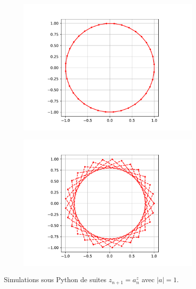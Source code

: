 \documentclass[12pt]{article}
\theoremstyle{definition}
\theoremstyle{theorem}
\begin{document}
\begin{figure}[H]
	\centering
	\begin{subfigure}{0.84\textwidth}
	\includegraphics[width=\textwidth]{resources/periodico.pdf}
	\end{subfigure}
	
	
	\begin{subfigure}{0.84\textwidth}
	\includegraphics[width=\textwidth]{resources/notperiodico.pdf}
	\end{subfigure}
	\caption{Simulations sous Python de suites $z_{n+1} = a^z_n$ avec $|a| = 1$.}
\end{figure}
\end{document}

